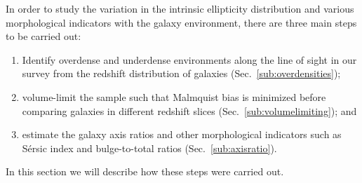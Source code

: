 \documentclass[twocolumn,useAMS,usenatbib]{mn2e}
\newcommand{\sersic}{S\'{e}rsic }
\begin{document}
In order to study the variation in the intrinsic ellipticity
distribution and various morphological indicators with the galaxy environment, there are three main steps to be carried out:
\begin{enumerate}
 \item Identify overdense and underdense environments along the line of sight in our survey
   from the redshift distribution of galaxies (Sec.~\ref{sub:overdensities});
 \item volume-limit the sample such that Malmquist bias is minimized
   before comparing galaxies in different redshift slices
   (Sec.~\ref{sub:volumelimiting}); and 
 \item estimate the galaxy axis ratios and other morphological indicators such as  \sersic index and bulge-to-total ratios (Sec.~\ref{sub:axisratio}).
\end{enumerate}

In this section we will describe how these steps were carried out.
\end{document}
